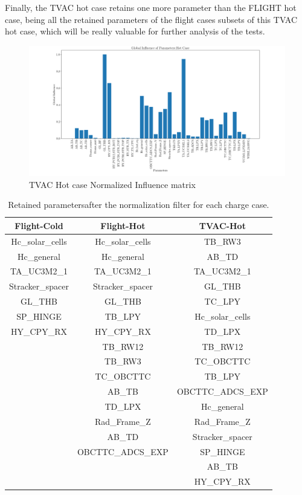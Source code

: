 Finally, the TVAC hot case retains one more parameter than the FLIGHT hot case, being all the retained parameters of the flight cases subsets of this TVAC hot case, which will be really valuable for further analysis of the tests.
\begin{figure}[H]
    \centering
    \includegraphics[width = \linewidth]{Figures/UPMSat3/TVAC/Nuevas/globalinfHC.png}
    \caption{TVAC Hot case Normalized Influence matrix}
    \label{fig:THC-globalinf}
\end{figure}


\begin{table}[H]
\centering
\caption{Retained parametersafter the normalization filter for each charge case.}
\label{tab:filteredparamsUPMSat3}
\begin{tabular}{c c c }
\toprule
\multicolumn{1}{c}{\textbf{Flight-Cold}} & \multicolumn{1}{c}{\textbf{Flight-Hot}}  & \multicolumn{1}{c}{\textbf{TVAC-Hot}} \\ \midrule
Hc\_solar\_cells  & Hc\_solar\_cells  &  TB\_RW3  \\
Hc\_general  & Hc\_general  &  AB\_TD  \\
TA\_UC3M2\_1  & TA\_UC3M2\_1  &  TA\_UC3M2\_1  \\
Stracker\_spacer  & Stracker\_spacer  &  GL\_THB  \\
GL\_THB  & GL\_THB  &  TC\_LPY  \\
SP\_HINGE  & TB\_LPY  &  Hc\_solar\_cells  \\
HY\_CPY\_RX  & HY\_CPY\_RX  &  TD\_LPX  \\
    & TB\_RW12  &  TB\_RW12  \\
    & TB\_RW3  &  TC\_OBCTTC  \\
    & TC\_OBCTTC  &  TB\_LPY  \\
    & AB\_TB  &  OBCTTC\_ADCS\_EXP  \\
    & TD\_LPX  &  Hc\_general  \\
    & Rad\_Frame\_Z  &  Rad\_Frame\_Z  \\
    & AB\_TD &  Stracker\_spacer  \\
    & OBCTTC\_ADCS\_EXP  &  SP\_HINGE  \\
    & & AB\_TB  \\
    & & HY\_CPY\_RX \\
    \bottomrule
\end{tabular}
\end{table}

